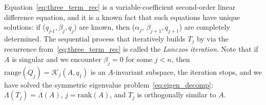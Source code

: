 \documentclass[10pt]{article}
\numberwithin{equation}{section}
\newcommand{\+}{%
	\raisebox{0.18ex}{\scaleobj{0.55}{+}}
}
\theoremstyle{definition}
\begin{document}
Equation~\eqref{eq:three_term_rec} is a variable-coefficient second-order linear difference equation, and it is a known fact that such equations have unique solutions: if ($q_{j\text{-}1}, \beta_j, q_j$) are known, then ($\alpha_j$, $\beta_{j+1}, q_{j+1}$) are completely determined. 
The sequential process that iteratively builds $T_j$ by via the recurrence from~\eqref{eq:three_term_rec} is called the \emph{Lanczos iteration}. 
Note that if $A$ is singular and we encounter $\beta_j = 0$ for some $j < n$, then $\mathrm{range}(Q_j) = \mathcal{K}_j(A, q_1)$ is an $A$-invariant subspace, the iteration stops, and we have solved the symmetric eigenvalue problem~\eqref{eq:eigen_decomp}: $\Lambda(T_j) = \Lambda(A)$, $j = \mathrm{rank}(A)$, and $T_j$ is orthogonally similar to $A$. 
\end{document}
